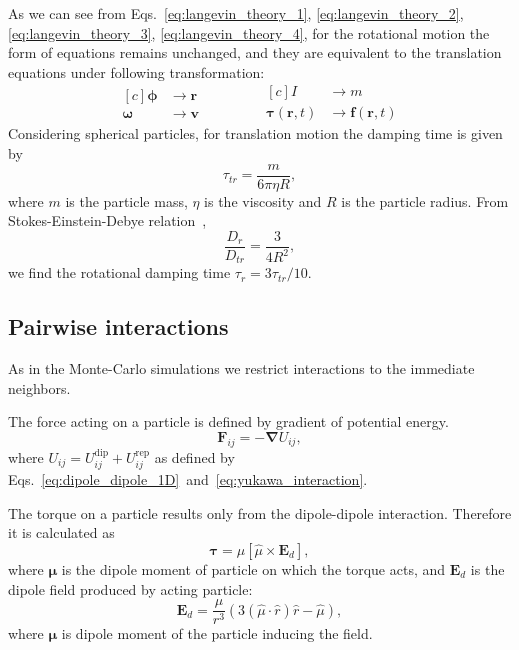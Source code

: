 As we can see from Eqs.~\eqref{eq:langevin_theory_1}, \eqref{eq:langevin_theory_2}, \eqref{eq:langevin_theory_3}, \eqref{eq:langevin_theory_4}, for the rotational motion the form of equations remains unchanged, and they are equivalent to the translation equations under following transformation:
\begin{equation}
\label{eq:rotation_translation_substitution}
	\begin{aligned}[c]
		\boldsymbol{\phi} &\rightarrow \boldsymbol{r}        \\
		\boldsymbol{\omega} &\rightarrow \boldsymbol{v} 
	\end{aligned}
	\qquad
	\qquad
	\begin{aligned}[c]
		I &\rightarrow m        \\
		\boldsymbol{\tau}(\boldsymbol{r}, t) &\rightarrow \boldsymbol{f}(\boldsymbol{r}, t)
	\end{aligned}
\end{equation}
Considering spherical particles, for translation motion the damping time is given by
\begin{equation}
\label{eq:Translation_damping_time}
	\tau_{tr} = \frac{m}{6 \pi \eta R}
	,
\end{equation}
where $m$ is the particle mass, $\eta$ is the viscosity and $R$ is the particle radius. From Stokes-Einstein-Debye relation~\cite{MazzaPhysRevE76031203},
\begin{equation}
	\frac{D_r}{D_{tr}} = \frac{3}{4 R^2}
	,
\end{equation}
we find the rotational damping time $\tau_{r} = 3\tau_{tr} / 10$.

\subsection{Pairwise interactions}

As in the Monte-Carlo simulations we restrict interactions to the immediate neighbors.

The force acting on a particle is defined by gradient of potential energy.
\begin{equation}
\label{eq:full_force}
	\boldsymbol{F}_{ij}
		= -\boldsymbol{\nabla} U_{ij},
\end{equation}
where $U_{ij} = U^\mathrm{dip}_{ij} + U^\mathrm{rep}_{ij}$ as defined by Eqs.~\eqref{eq:dipole_dipole_1D}~and~\eqref{eq:yukawa_interaction}.

The torque on a particle results only from the dipole-dipole interaction. Therefore it is calculated as
\begin{equation}
\label{eq:dipole_torque}
	\boldsymbol{\tau}  = \mu[\hat{\mu} \times \boldsymbol{E}_d ],
\end{equation}
where $\boldsymbol{\mu}$ is the dipole moment of particle on which the torque acts, and $\boldsymbol{E}_d$ is the dipole field produced by acting particle:
\begin{equation}
\label{eq:dipole_field}
	\boldsymbol{E}_d = \frac{\mu}{r^3}
		\left(3 (\hat{\mu} \cdot \hat{r}) \hat{r} - \hat{\mu} \right),
\end{equation}
where $\boldsymbol{\mu}$ is dipole moment of the particle inducing the field.

